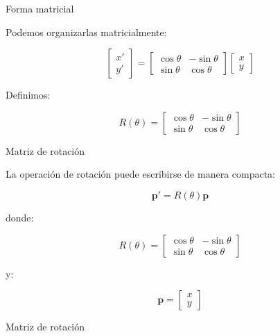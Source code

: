 \documentclass[aspectratio=169]{beamer}
\begin{document}
\begin{frame}{Forma matricial}

    Podemos organizarlas matricialmente:

    \[
    \begin{bmatrix}
        x'\\
        y'
    \end{bmatrix}
    =
    \begin{bmatrix}
        \cos\theta & -\sin\theta\\
        \sin\theta & \cos\theta
    \end{bmatrix}
    \begin{bmatrix}
        x\\
        y
    \end{bmatrix}
    \]

    Definimos:

    \[
    \boxed{
        R(\theta)
        =
        \begin{bmatrix}
            \cos\theta & -\sin\theta\\
            \sin\theta & \cos\theta
    \end{bmatrix}}
    \]

\end{frame}

\begin{frame}{Matriz de rotación}

    La operación de rotación puede escribirse de manera compacta:

    \[
    \boxed{
        \mathbf{p}'=R(\theta)\mathbf{p}
    }
    \]

    donde:

    \[
    R(\theta)
    =
    \begin{bmatrix}
        \cos\theta & -\sin\theta\\
        \sin\theta & \cos\theta
    \end{bmatrix}
    \]

    y:

    \[
    \mathbf{p}
    =
    \begin{bmatrix}
        x\\
        y
    \end{bmatrix}
    \]

\end{frame}

\begin{frame}{Matriz de rotación}


    \vspace{0.3cm}


\end{frame}
\end{document}
